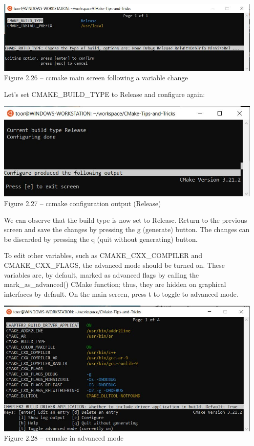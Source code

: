 \begin{center}
\includegraphics[width=1.\textwidth]{content/1/chapter2/images/26.jpg}\\
Figure 2.26 – ccmake main screen following a variable change
\end{center}

Let's set CMAKE\_BUILD\_TYPE to Release and configure again:

\begin{center}
\includegraphics[width=1.\textwidth]{content/1/chapter2/images/27.jpg}\\
Figure 2.27 – ccmake configuration output (Release)
\end{center}

We can observe that the build type is now set to Release. Return to the previous screen and save the changes by pressing the g (generate) button. The changes can be discarded by pressing the q (quit without generating) button.

To edit other variables, such as CMAKE\_CXX\_COMPILER and CMAKE\_CXX\_FLAGS, the advanced mode should be turned on. These variables are, by default, marked as advanced flags by calling the mark\_as\_advanced() CMake function; thus, they are hidden on graphical interfaces by default. On the main screen, press t to toggle to advanced mode.

\begin{center}
\includegraphics[width=1.\textwidth]{content/1/chapter2/images/28.jpg}\\
Figure 2.28 – ccmake in advanced mode
\end{center}

